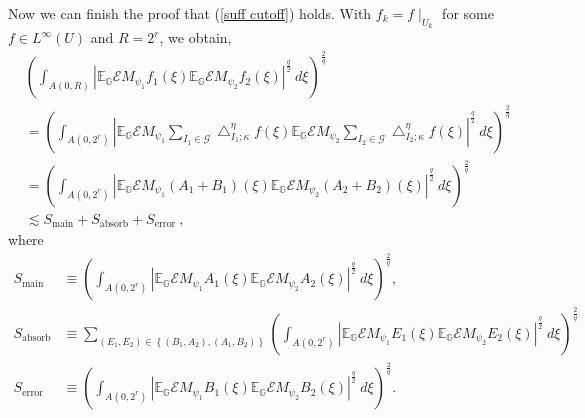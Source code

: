 \documentclass{amsart}%
\theoremstyle{plain}
\numberwithin{equation}{section}
\begin{document}
Now we can finish the proof that (\ref{suff cutoff}) holds. With $f_{k}%
=f\mid_{U_{k}}$ for some $f\in L^{\infty}\left(  U\right)  $ and $R=2^{r}$, we
obtain,%
\begin{align}
& \left(  \int_{A\left(  0,R\right)  }\left\vert \mathbb{E}_{\mathbb{G}%
}\mathcal{E}M_{\psi_{1}}f_{1}\left(  \xi\right)  \mathbb{E}_{\mathbb{G}%
}\mathcal{E}M_{\psi_{2}}f_{2}\left(  \xi\right)  \right\vert ^{\frac{q}{2}%
}\ d\xi\right)  ^{\frac{2}{q}}\label{start}\\
& =\left(  \int_{A\left(  0,2^{r}\right)  }\left\vert \mathbb{E}_{\mathbb{G}%
}\mathcal{E}M_{\psi_{1}}\sum_{I_{1}\in\mathcal{G}}\bigtriangleup_{I_{1}%
;\kappa}^{\eta}f\left(  \xi\right)  \mathbb{E}_{\mathbb{G}}\mathcal{E}%
M_{\psi_{2}}\sum_{I_{2}\in\mathcal{G}}\bigtriangleup_{I_{2};\kappa}^{\eta
}f\left(  \xi\right)  \right\vert ^{\frac{q}{2}}\ d\xi\right)  ^{\frac{2}{q}%
}\nonumber\\
& =\left(  \int_{A\left(  0,2^{r}\right)  }\left\vert \mathbb{E}_{\mathbb{G}%
}\mathcal{E}M_{\psi_{1}}\left(  A_{1}+B_{1}\right)  \left(  \xi\right)
\mathbb{E}_{\mathbb{G}}\mathcal{E}M_{\psi_{2}}\left(  A_{2}+B_{2}\right)
\left(  \xi\right)  \right\vert ^{\frac{q}{2}}\ d\xi\right)  ^{\frac{2}{q}%
}\nonumber\\
& \lesssim S_{\operatorname*{main}}+S_{\operatorname*{absorb}}%
+S_{\operatorname*{error}}\ ,\nonumber
\end{align}
where%
\begin{align*}
S_{\operatorname*{main}}  & \equiv\left(  \int_{A\left(  0,2^{r}\right)
}\left\vert \mathbb{E}_{\mathbb{G}}\mathcal{E}M_{\psi_{1}}A_{1}\left(
\xi\right)  \mathbb{E}_{\mathbb{G}}\mathcal{E}M_{\psi_{2}}A_{2}\left(
\xi\right)  \right\vert ^{\frac{q}{2}}\ d\xi\right)  ^{\frac{2}{q}},\\
S_{\operatorname*{absorb}}  & \equiv\sum_{\left(  E_{1},E_{2}\right)
\in\left\{  \left(  B_{1},A_{2}\right)  ,\left(  A_{1},B_{2}\right)  \right\}
}\left(  \int_{A\left(  0,2^{r}\right)  }\left\vert \mathbb{E}_{\mathbb{G}%
}\mathcal{E}M_{\psi_{1}}E_{1}\left(  \xi\right)  \mathbb{E}_{\mathbb{G}%
}\mathcal{E}M_{\psi_{2}}E_{2}\left(  \xi\right)  \right\vert ^{\frac{q}{2}%
}\ d\xi\right)  ^{\frac{2}{q}}\\
S_{\operatorname*{error}}  & \equiv\left(  \int_{A\left(  0,2^{r}\right)
}\left\vert \mathbb{E}_{\mathbb{G}}\mathcal{E}M_{\psi_{1}}B_{1}\left(
\xi\right)  \mathbb{E}_{\mathbb{G}}\mathcal{E}M_{\psi_{2}}B_{2}\left(
\xi\right)  \right\vert ^{\frac{q}{2}}\ d\xi\right)  ^{\frac{2}{q}}.
\end{align*}
\end{document}
